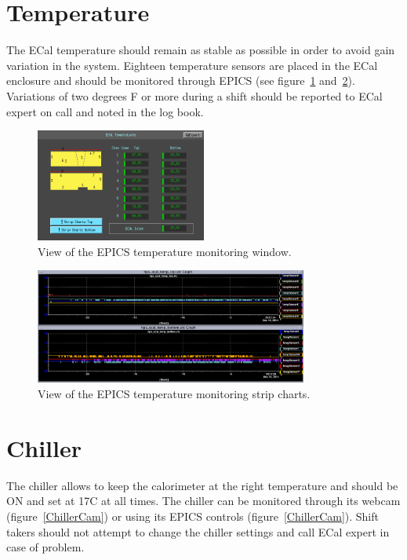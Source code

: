 \documentclass[12pt]{article}
\begin{document}
 \onecolumn

      \section{Temperature}

         The ECal temperature should remain as stable as possible in order to avoid gain variation in the system. Eighteen temperature sensors are placed in the ECal enclosure and should be monitored through EPICS (see figure~\ref{temp} and~\ref{temp2}). Variations of two degrees F or more during a shift should be reported to ECal expert on call and noted in the log book.

\begin{figure}[htbp]
\center
\includegraphics[width=0.5\textwidth]{pics/EcalTemp_2014_12_20.png}
\caption{\small \label{temp} View of the EPICS temperature monitoring window.}
\end{figure}
      
\begin{figure}[htbp]
\center
\includegraphics[width=0.8\textwidth]{pics/ECal_temp_s.png}
\caption{\small \label{temp2} View of the EPICS temperature monitoring strip charts.}
\end{figure}

       \section{Chiller}

         The chiller allows to keep the calorimeter at the right temperature and should be ON and set at 17C at all times. The chiller can be monitored through its webcam (figure~\ref{ChillerCam}) or using its EPICS controls (figure~\ref{ChillerCam}). Shift takers should not attempt to change the chiller settings and call ECal expert in case of problem.
\end{document}
